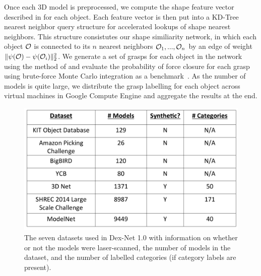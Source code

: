 Once each 3D model is preprocessed, we compute the shape feature vector described in  for each object.
Each feature vector is then put into a KD-Tree nearest neighbor query structure for accelerated lookups of shape nearest neighbors.
This structure consistutes our shape similiarity network, in which each object $\mathcal{O}$  is connected to its $n$ nearest neighbors $\mathcal{O}_1, ..., \mathcal{O}_n$ by an edge of weight $\| \psi(\mathcal{O}) - \psi(\mathcal{O}_i) \|_2^2$.
We generate a set of grasps for each object in the network using the method of  and evaluate the probability of force closure for each grasp using brute-force Monte Carlo integration as a benchmark~\cite{kehoe2012toward}.
As the number of models is quite large, we distribute the grasp labelling for each object across virtual machines in Google Compute Engine and aggregate the results at the end.


\begin{figure}[t!]
\centering
\includegraphics[scale=0.1]{figures/dataset_table.jpg}
\caption{The seven datasets used in Dex-Net 1.0 with information on whether or not the models were laser-scanned, the number of models in the dataset, and the number of labelled categories (if category labels are present). }
\vspace*{-15pt}
\end{figure}